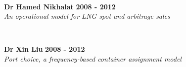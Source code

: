 \documentclass[margin]{res}
\newcommand\tab[1][1cm]{\hspace*{#1}}
\begin{document}
\begin{resume}
\begin{minipage}{\textwidth}
	\end{minipage}
	\\
	\vspace{0.03in}
	\begin{minipage}{\textwidth}
	{\bf Dr Hamed Nikhalat} \hfill {\bf 2008 - 2012} \\
	\tab[0.2in] \textit{An operational model for LNG spot and arbitrage sales}
	\end{minipage}
	\\
	\vspace{0.03in}
	\begin{minipage}{\textwidth}
	{\bf Dr Xin Liu} \hfill {\bf 2008 - 2012} \\
	\tab[0.2in] \textit{Port choice, a frequency-based container assignment model}
	\end{minipage}
	\\

\vspace{-0.15in}

\end{resume}
\end{document}
